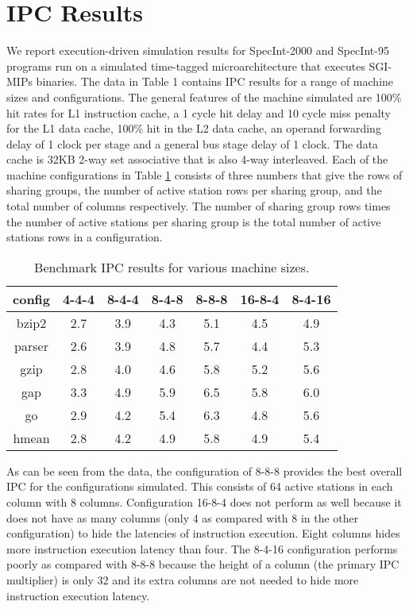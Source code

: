 \documentclass[10pt,twocolumn,dvips]{article}
\begin{document}
\section{IPC Results}
\vspace{-0.1in}
We report execution-driven simulation results for  
SpecInt-2000 and SpecInt-95 programs run on a 
simulated time-tagged microarchitecture 
that executes SGI-MIPs binaries. 
The data in Table 1 contains IPC results for a range of machine sizes
and configurations. 
The general features of
the machine simulated are 100\% hit rates for L1 instruction cache,
a 1 cycle hit delay and 10 cycle miss penalty for the L1 data cache,
100\% hit in the L2 data cache, an operand forwarding delay of 1 clock
per stage
and a general bus stage delay of 1 clock.  The data cache is 32KB 2-way
set associative that is also 4-way interleaved.
Each of the machine configurations in Table \ref{tab:ipc} consists of three
numbers that give the rows of sharing groups, the number
of active station rows per sharing group, and the total number of 
columns respectively.  The number of sharing group rows times the
number of active stations per sharing group is the total number of
active stations rows in a configuration.  
\begin{table}
\footnotesize{
\begin{center}
\begin{tabular}{|c|c|c|c|c|c|c|}
\hline 
config&
4-4-4&
8-4-4&
8-4-8&
8-8-8&
16-8-4&
8-4-16\\
\hline
\hline 
bzip2&
2.7&
3.9&
4.3&
5.1&
4.5&
4.9\\
\hline 
parser&
2.6&
3.9&
4.8&
5.7&
4.4&
5.3\\
\hline 
gzip&
2.8&
4.0&
4.6&
5.8&
5.2&
5.6\\
\hline 
gap&
3.3&
4.9&
5.9&
6.5&
5.8&
6.0\\
\hline 
go&
2.9&
4.2&
5.4&
6.3&
4.8&
5.6\\
\hline 
hmean&
2.8&
4.2&
4.9&
5.8&
4.9&
5.4\\
\hline
\end{tabular}
\end{center}
}
\caption{Benchmark IPC results for various machine sizes.}\label{tab:ipc}
\end{table}

As can be seen from the data, the configuration of 8-8-8 provides
the best overall IPC for the configurations simulated.  This consists
of 64 active stations in each column with 8 columns.
Configuration 16-8-4 does not perform as well because it does not
have as many columns (only 4 as compared with 8 in the other configuration)
to hide the latencies of instruction execution.  Eight columns 
hides more instruction execution latency than four.  The 8-4-16
configuration performs poorly as compared with 8-8-8 because the height
of a column (the primary IPC multiplier) is only 32 and its extra
columns are not needed to hide more instruction execution latency.
\vspace{-0.2in}
\end{document}
